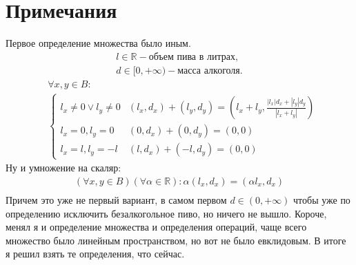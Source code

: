 \section*{Примечания}
Первое определение множества было иным.
\begin{align*}
  l \in \mathbb{R} - \text{объем пива в литрах,} \\
  d \in [0, +\infty)- \text{масса алкоголя.}
\end{align*}
\begin{align*}
   & \forall x, y \in B:                                             \\
   & \begin{cases}
       l_x \neq 0 \lor l_y \neq 0 & (l_x, d_x) + (l_y, d_y) =
       \left(l_x + l_y, \frac{|l_x|d_x + |l_y|d_y}{|l_x + l_y|}\right) \\
       l_x = 0,l_y = 0            & (0, d_x) + (0, d_y) =
       \left(0, 0\right)                                               \\
       l_x = l, l_y = -l          & (l, d_x) + (-l, d_y) =
       \left(0, 0\right)
     \end{cases}
\end{align*}
Ну и умножение на скаляр:
\begin{align*}
  (\forall x,y \in B)(\forall \alpha \in \mathbb{R}):
  \alpha(l_x, d_x) = (\alpha l_x, d_x) \\
\end{align*}
Причем это уже не первый вариант, в самом первом $d \in (0,+\infty)$ чтобы уже по определению исключить безалкогольное пиво, но ничего не вышло. Короче, менял я и определение множества и определения операций, чаще всего множество было линейным пространством, но вот не было евклидовым. В итоге я решил взять те определения, что сейчас.
